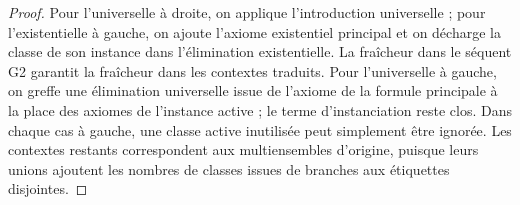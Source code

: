 \documentclass[../../../include/open-logic-section]{subfiles}
\begin{document}
\begin{proof}
Pour l'universelle à droite, on applique l'introduction
universelle ; pour l'existentielle à gauche, on ajoute
l'axiome existentiel principal et on décharge la classe
de son instance dans l'élimination existentielle.
La fraîcheur dans le séquent G2 garantit la fraîcheur
dans les contextes traduits. Pour l'universelle à gauche,
on greffe une élimination universelle issue de l'axiome
de la formule principale à la place des axiomes de
l'instance active ; le terme d'instanciation reste clos.
Dans chaque cas à gauche, une classe active inutilisée
peut simplement être ignorée.
Les contextes restants correspondent aux multiensembles
d'origine, puisque leurs unions ajoutent les nombres
de classes issues de branches aux étiquettes disjointes.
\end{proof}
\end{document}
